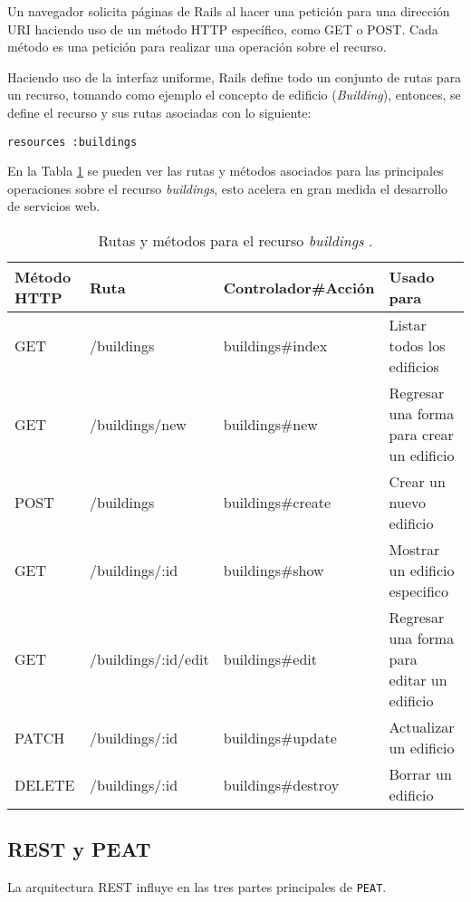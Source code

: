 Un navegador solicita páginas de Rails al hacer una petición para una dirección URI
haciendo uso de un método HTTP específico, como GET o POST. Cada método es una
petición para realizar una operación sobre el recurso.

Haciendo uso de la interfaz uniforme, Rails define todo un conjunto de rutas
para un recurso, tomando como ejemplo el concepto de edificio (\textit{Building}),
entonces, se define el recurso y sus rutas asociadas con lo siguiente:

\begin{verbatim}
resources :buildings
\end{verbatim}

En la Tabla \ref{table:rest} se pueden ver las rutas y métodos asociados para
las principales operaciones sobre el recurso \textit{buildings}, esto acelera
en gran medida el desarrollo de servicios web.

\begin{table}[h!]
  \centering
  \begin{tabular}{|m{1.2cm}|m{2.5cm}|m{3cm}|m{3.5cm}|}
    \hline
    \rowcolor{lightgray} \textbf{Método HTTP} & \textbf{Ruta} & \textbf{Controlador\#Acción} & \textbf{Usado para}\\
    \hline\hline
    GET & /buildings & buildings\#index & Listar todos los edificios\\
    \hline
    GET & /buildings/new & buildings\#new & Regresar una forma para crear un edificio\\ [2ex]
    \hline
    POST & /buildings & buildings\#create & Crear un nuevo edificio\\
    \hline
    GET & /buildings/:id & buildings\#show & Mostrar un edificio especifico\\
    \hline
    GET & /buildings/:id/edit & buildings\#edit & Regresar una forma para editar un edificio\\
    \hline
    PATCH & /buildings/:id & buildings\#update & Actualizar un edificio\\
    \hline
    DELETE & /buildings/:id & buildings\#destroy & Borrar un edificio\\
    \hline
  \end{tabular}
  \caption{Rutas y métodos para el recurso \textit{buildings} \cite{18_rails_rest}.}
  \label{table:rest}
\end{table}

\subsection{REST y PEAT}
La arquitectura REST influye en las tres partes principales de \texttt{PEAT}.

